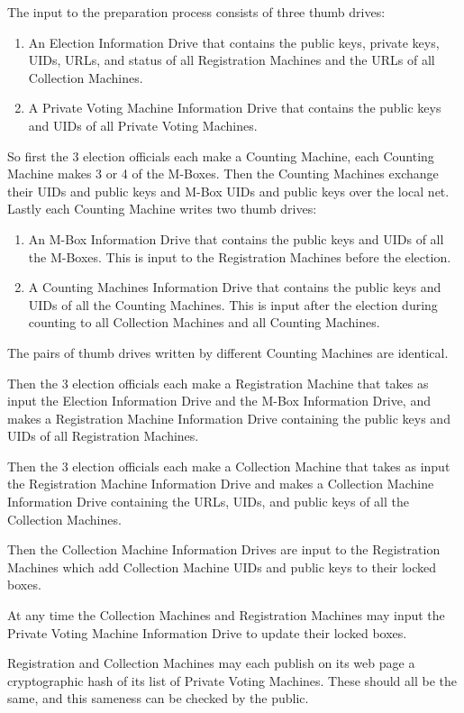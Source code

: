 \documentclass[12pt]{article}
\begin{document}
The input to the preparation process consists of three thumb drives:
\begin{enumerate}
\item An Election Information Drive that contains the
public keys, private keys, UIDs, URLs, and status of all Registration
Machines and the URLs of all Collection Machines.
\item A Private Voting Machine Information Drive that contains the
public keys and UIDs of all Private Voting Machines.
\end{enumerate}

So first the 3 election officials each make a Counting Machine,
each Counting Machine makes 3 or 4 of the M-Boxes.  Then
the Counting Machines exchange their UIDs and public keys and M-Box
UIDs and public keys over the local net.  Lastly each Counting Machine
writes two thumb drives:
\begin{enumerate}
\item An M-Box Information Drive that contains the public keys and
UIDs of all the M-Boxes.  This is input to the Registration Machines
before the election.
\item A Counting Machines Information Drive that contains the public keys and
UIDs of all the Counting Machines.  This is input after the election during
counting to all Collection Machines and all Counting Machines.
\end{enumerate}
The pairs of thumb drives written by different Counting Machines are identical.

Then the 3 election officials each make a Registration Machine
that takes as input the Election Information Drive and the
M-Box Information Drive, and makes a Registration Machine
Information Drive containing the public keys and UIDs of all
Registration Machines.

Then the 3 election officials each make a Collection Machine
that takes as input the Registration Machine Information Drive
and makes a Collection Machine Information Drive containing
the URLs, UIDs, and public keys of all the Collection Machines.

Then the Collection Machine Information Drives are input to
the Registration Machines which add Collection Machine UIDs
and public keys to their locked boxes.

At any time the Collection Machines and Registration Machines
may input the Private Voting Machine Information Drive to
update their locked boxes.

Registration and Collection Machines may each publish on its web page
a cryptographic hash of its list of Private Voting Machines.
These should all be the same, and this sameness
can be checked by the public.
\end{document}
